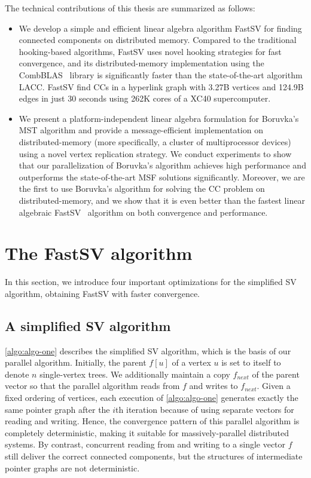\documentclass{sokendai_thesis} %
\newcommand{\boruvka}[0]{Boruvka}
\begin{document}
The technical contributions of this thesis are summarized as follows:
\begin{itemize}
\item We develop a simple and efficient linear algebra algorithm FastSV for finding connected components on distributed memory. Compared to the traditional hooking-based algorithms, FastSV uses novel hooking strategies for fast convergence, and its distributed-memory implementation using the CombBLAS~\cite{combblas} library is significantly faster than the state-of-the-art algorithm LACC. FastSV find CCs in a hyperlink graph with 3.27B vertices and 124.9B edges in just $30$ seconds using 262K cores of a XC40 supercomputer.

\item We present a platform-independent linear algebra formulation for \boruvka{}'s MST algorithm and provide a message-efficient implementation on distributed-memory (more specifically, a cluster of multiprocessor devices) using a novel vertex replication strategy.
We conduct experiments to show that our parallelization of \boruvka{}'s algorithm achieves high performance and outperforms the state-of-the-art MSF solutions significantly.
Moreover, we are the first to use \boruvka{}'s algorithm for solving the CC problem on distributed-memory, and we show that it is even better than the fastest linear algebraic FastSV~\cite{fastsv} algorithm on both convergence and performance.

\end{itemize}

\section{The FastSV algorithm}
\label{sec:algo-two}

In this section, we introduce four important optimizations for the simplified SV algorithm, obtaining FastSV with faster convergence.

\subsection{A simplified SV algorithm }
\label{sec:algo-one}
\autoref{algo:algo-one} describes the simplified SV algorithm, which is the basis of our parallel algorithm. 
Initially, the parent $f[u]$ of a vertex $u$ is set to itself to denote $n$ single-vertex trees. 
We additionally maintain a copy $f_{\mathit{next}}$  of the parent vector so that the parallel algorithm reads from $f$ and writes to $f_{\mathit{next}}$.
Given a fixed ordering of vertices, each execution of \autoref{algo:algo-one} generates exactly the same pointer graph after the $i$th iteration because of using separate vectors for reading and writing. 
Hence, the convergence pattern of this parallel algorithm is completely deterministic, making it suitable for massively-parallel distributed systems.  
By contrast, concurrent reading from and writing to a single vector $f$ still deliver the correct connected components, but the structures of intermediate pointer graphs are not deterministic. 
\end{document}
